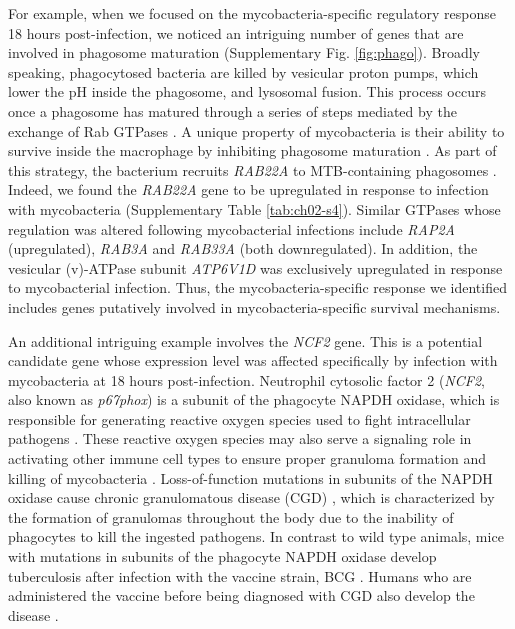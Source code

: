 For example, when we focused on the mycobacteria-specific regulatory
response 18 hours post-infection, we noticed an intriguing number of
genes that are involved in phagosome maturation (Supplementary Fig. \ref{fig:phago}). Broadly speaking, phagocytosed bacteria are killed by vesicular
proton pumps, which lower the pH inside the phagosome, and lysosomal
fusion. This process occurs once a phagosome has matured through a
series of steps mediated by the exchange of Rab GTPases \citep{Vergne2004,
Mortellaro2009}. A unique property of mycobacteria is their ability
to survive inside the macrophage by inhibiting phagosome maturation
\citep{Hestvik2005}. As part of this strategy, the bacterium recruits
\emph{RAB22A} to MTB-containing phagosomes \citep{Roberts2006}. Indeed,
we found the \emph{RAB22A} gene to be upregulated in response to
infection with mycobacteria (Supplementary Table \ref{tab:ch02-s4}). Similar GTPases
whose regulation was altered following mycobacterial infections include
\emph{RAP2A} (upregulated), \emph{RAB3A} and \emph{RAB33A} (both
downregulated). In addition, the vesicular (v)-ATPase subunit
\emph{ATP6V1D} was exclusively upregulated in response to mycobacterial
infection. Thus, the mycobacteria-specific response we identified
includes genes putatively involved in mycobacteria-specific survival
mechanisms.

An additional intriguing example involves the \emph{NCF2} gene. This is
a potential candidate gene whose expression level was affected
specifically by infection with mycobacteria at 18 hours post-infection.
Neutrophil cytosolic factor 2 (\emph{NCF2}, also known as
\emph{p67phox}) is a subunit of the phagocyte NAPDH oxidase, which is
responsible for generating reactive oxygen species used to fight
intracellular pathogens \citep{Ehrt2001, Myers2003, Babior2004,
Bustamante2011, Kim2011c, Deffert2014}. These reactive oxygen
species may also serve a signaling role in activating other immune cell
types to ensure proper granuloma formation and killing of mycobacteria
\citep{Deffert2014a}. Loss-of-function mutations in subunits of the NAPDH
oxidase cause chronic granulomatous disease (CGD) \citep{Deffert2014},
which is characterized by the formation of granulomas throughout the
body due to the inability of phagocytes to kill the ingested pathogens.
In contrast to wild type animals, mice with mutations in subunits of the
phagocyte NAPDH oxidase develop tuberculosis after infection with the
vaccine strain, BCG \citep{Deffert2014a}. Humans who are administered the
vaccine before being diagnosed with CGD also develop the disease
\citep{Deffert2014}.

